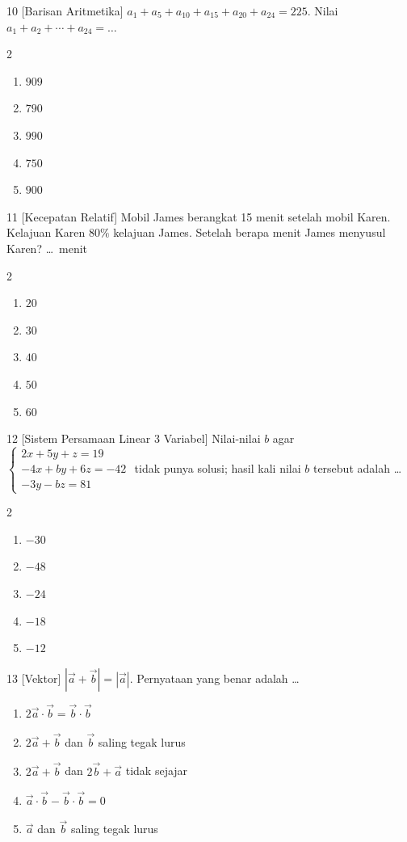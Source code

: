 \documentclass[11pt]{article}
\newenvironment{pil}{%
  \begin{enumerate}[label=(\alph*),leftmargin=*,itemsep=1pt,topsep=3pt]}%
  {\end{enumerate}}
\newenvironment{pilB}{%
  \par\smallskip\begin{multicols}{2}
  \begin{enumerate}[label=(\alph*),leftmargin=*,itemsep=1pt,topsep=3pt]}%
  {\end{enumerate}\end{multicols}}
\begin{document}
\begin{soal}{10 \normalfont\small[Barisan Aritmetika]}
$a_1+a_5+a_{10}+a_{15}+a_{20}+a_{24}=225$. Nilai $a_1+a_2+\cdots+a_{24}=\ldots$
\begin{pilB}
  \item $909$ \item $790$ \item $990$ \item $750$ \item $900$
\end{pilB}
\end{soal}

\begin{soal}{11 \normalfont\small[Kecepatan Relatif]}
Mobil James berangkat 15 menit setelah mobil Karen. Kelajuan Karen $80\%$ kelajuan James.
Setelah berapa menit James menyusul Karen? \ldots\ menit
\begin{pilB}
  \item $20$ \item $30$ \item $40$ \item $50$ \item $60$
\end{pilB}
\end{soal}

\begin{soal}{12 \normalfont\small[Sistem Persamaan Linear 3 Variabel]}
Nilai-nilai $b$ agar $\begin{cases}2x+5y+z=19\\-4x+by+6z=-42\\-3y-bz=81\end{cases}$ tidak punya solusi; hasil kali nilai $b$ tersebut adalah \ldots
\begin{pilB}
  \item $-30$ \item $-48$ \item $-24$ \item $-18$ \item $-12$
\end{pilB}
\end{soal}

\begin{soal}{13 \normalfont\small[Vektor]}
$|\vec a+\vec b|=|\vec a|$. Pernyataan yang benar adalah \ldots
\begin{pil}
  \item $2\vec a\cdot\vec b=\vec b\cdot\vec b$
  \item $2\vec a+\vec b$ dan $\vec b$ saling tegak lurus
  \item $2\vec a+\vec b$ dan $2\vec b+\vec a$ tidak sejajar
  \item $\vec a\cdot\vec b-\vec b\cdot\vec b=0$
  \item $\vec a$ dan $\vec b$ saling tegak lurus
\end{pil}
\end{soal}
\end{document}
